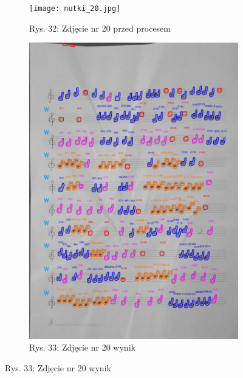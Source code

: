 \documentclass[11pt]{article}
\begin{document}
\begin{figure}
\begin{subfigure}[b]{0.475\textwidth}
        \centering
        \graphicspath{ {Resources/} }
        \texttt{[image: nutki\_20.jpg]}
        \caption[]%
        {{\small Rys. 32: Zdjęcie nr 20 przed procesem}}
        \label{fig:sub3}
    \end{subfigure}
    \quad
    \begin{subfigure}[b]{0.475\textwidth}
        \centering
        \graphicspath{ {blobs/} }
        \includegraphics[width=\textwidth]{20_cnts.jpg}
        \caption[]%
        {{\small Rys. 33: Zdjęcie nr 20 wynik}}
        \label{fig:sub 4}
    \end{subfigure}
    \label{fig 3}
\end{figure}

\FloatBarrier
\end{document}
